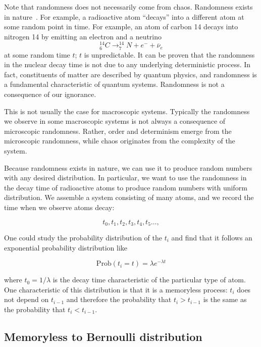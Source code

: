 \documentclass[justified,sixbynine]{tufte-book}
\theoremstyle{plain}%
\theoremstyle{definition}
\theoremstyle{remark}
\begin{document}
\begin{fullwidth}
Note that randomness does not necessarily come from chaos.
Randomness exists in nature~\cite{determinism}\cite{decay}.
For example, a radioactive atom ``decays'' into a different atom
at some random point in time. For example, an atom of carbon 14 decays into nitrogen 14 by emitting an electron and a neutrino
\begin{equation}
_6^{14}C\longrightarrow _7^{14}N+e^{-}+\overline{\nu }_e
\end{equation}
at some random time $t$; $t$ is unpredictable. It can be proven that the
randomness in the nuclear decay time is not due to any underlying
deterministic process. In fact, constituents of matter are
described by quantum physics, and randomness is a fundamental characteristic
of quantum systems. Randomness is not a consequence of our ignorance.

This is not usually the case for macroscopic systems. Typically the
randomness we observe in some macroscopic systems is not always a
consequence of microscopic randomness. Rather, order and determinism
emerge from the microscopic randomness, while chaos originates from the complexity of
the system.

Because randomness exists in nature, we can use it to produce random numbers
with any desired distribution. In particular, we want to use the randomness
in the decay time of radioactive atoms to produce random numbers with
uniform distribution. We assemble a system consisting of many
atoms, and we record the time when we observe atoms decay:

\begin{equation}
t_0,t_1,t_2,t_3,t_4,t_5\dots,
\end{equation}

One could study the probability distribution of the $t_i$ and find
that it follows an exponential probability distribution like

\begin{equation}
\textrm{Prob}(t_i = t)=\lambda e^{-\lambda t}
\end{equation}

where $t_0=1/\lambda $ is the decay time characteristic of the particular
type of atom. One characteristic of this distribution is that it is a memoryless process: $t_i$ does not depend on $t_{i-1}$ and therefore the probability that $t_i>t_{i-1}$ is the same as the probability that $t_i<t_{i-1}$.

\goodbreak\subsection{Memoryless to Bernoulli distribution}


\end{fullwidth}
\end{document}
